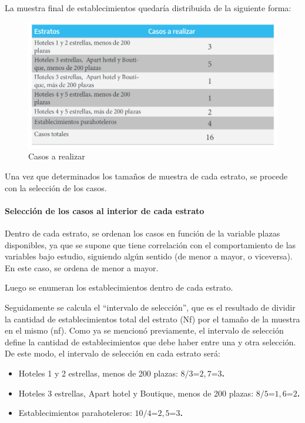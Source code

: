 \documentclass[
]{book}
\begin{document}
La muestra final de establecimientos quedaría distribuida de la siguiente forma:

\begin{figure}

{\centering \includegraphics[width=0.8\linewidth]{imagenes/tabla_2C} 

}

\caption{Casos a realizar}\label{fig:casos-a-realizar}
\end{figure}

Una vez que determinados los tamaños de muestra de cada estrato, se procede con la selección de los casos.

\hypertarget{selecciuxf3n-de-los-casos-al-interior-de-cada-estrato}{%
\paragraph{Selección de los casos al interior de cada estrato}\label{selecciuxf3n-de-los-casos-al-interior-de-cada-estrato}}

Dentro de cada estrato, se ordenan los casos en función de la variable plazas disponibles, ya que se supone que tiene correlación con el comportamiento de las variables bajo estudio, siguiendo algún sentido (de menor a mayor, o viceversa). En este caso, se ordena de menor a mayor.

Luego se enumeran los establecimientos dentro de cada estrato.

Seguidamente se calcula el ``intervalo de selección'', que es el resultado de dividir la cantidad de establecimientos total del estrato (Nf) por el tamaño de la muestra en el mismo (nf). Como ya se mencionó previamente, el intervalo de selección define la cantidad de establecimientos que debe haber entre una y otra selección. De este modo, el intervalo de selección en cada estrato será:

\begin{itemize}
\item
  Hoteles 1 y 2 estrellas, menos de 200 plazas: \(8/3\)=\(2,7\)=\(3\)\textbf{.}
\item
  Hoteles 3 estrellas, Apart hotel y Boutique, menos de 200 plazas: \(8/5\)=\(1,6\)=\(2\)\textbf{.}
\item
  Establecimientos parahoteleros: \(10/4\)=\(2,5\)=\(3\)\textbf{.}
\end{itemize}
\end{document}
